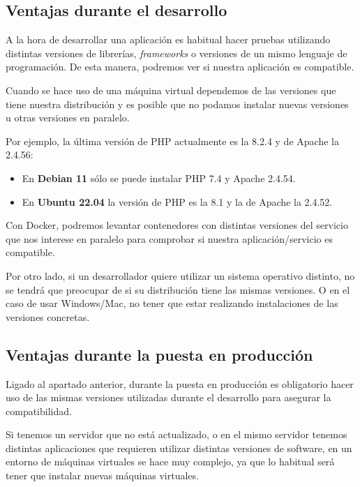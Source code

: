 \subsection{Ventajas durante el desarrollo}

A la hora de desarrollar una aplicación es habitual hacer pruebas utilizando distintas versiones de librerías, \textit{frameworks} o versiones de un mismo lenguaje de programación. De esta manera, podremos ver si nuestra aplicación es compatible.

Cuando se hace uso de una máquina virtual dependemos de las versiones que tiene nuestra distribución y es posible que no podamos instalar nuevas versiones u otras versiones en paralelo.

Por ejemplo, la última versión de PHP actualmente es la 8.2.4 y de Apache la 2.4.56:

\begin{itemize}
    \item En\textbf{ Debian 11} sólo se puede instalar PHP 7.4 y Apache 2.4.54.
    \item En \textbf{Ubuntu 22.04} la versión de PHP es la 8.1 y la de Apache la 2.4.52.
\end{itemize}

Con Docker, podremos levantar contenedores con distintas versiones del servicio que nos interese en paralelo para comprobar si nuestra aplicación/servicio es compatible.


Por otro lado, si un desarrollador quiere utilizar un sistema operativo distinto, no se tendrá que preocupar de si su distribución tiene las mismas versiones. O en el caso de usar Windows/Mac, no tener que estar realizando instalaciones de las versiones concretas.


\subsection{Ventajas durante la puesta en producción}
Ligado al apartado anterior, durante la puesta en producción es obligatorio hacer uso de las mismas versiones utilizadas durante el desarrollo para asegurar la compatibilidad.


Si tenemos un servidor que no está actualizado, o en el mismo servidor tenemos distintas aplicaciones que requieren utilizar distintas versiones de software, en un entorno de máquinas virtuales se hace muy complejo, ya que lo habitual será tener que instalar nuevas máquinas virtuales.

